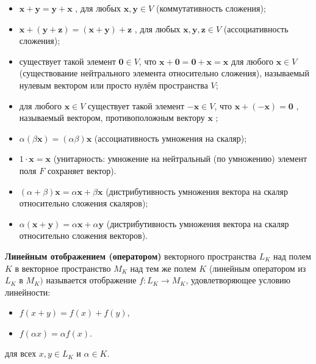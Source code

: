 \documentclass[12pt]{matmex-diploma}
\begin{document}
            \begin{itemize}
                \item $\mathbf {x} +\mathbf {y} =\mathbf {y} +\mathbf {x}$ , для любых $\mathbf {x} ,\mathbf {y} \in V$ (коммутативность сложения);
                \item $\mathbf {x} +(\mathbf {y} +\mathbf {z} )=(\mathbf {x} +\mathbf {y} )+\mathbf {z}$ , для любых $\mathbf {x} ,\mathbf {y} ,\mathbf {z} \in V$ (ассоциативность сложения);
                \item существует такой элемент $\mathbf {0} \in V$, что $\mathbf {x} +\mathbf {0} =\mathbf {0} +\mathbf {x} =\mathbf {x}$ для любого $\mathbf {x} \in V$ (существование нейтрального элемента относительно сложения), называемый нулевым вектором или просто нулём пространства $V$;
                \item для любого $\mathbf {x} \in V$ существует такой элемент $-\mathbf {x} \in V$, что $\mathbf {x} +(-\mathbf {x} )=\mathbf {0}$ , называемый вектором, противоположным вектору $\mathbf {x}$ ;
                \item $\alpha (\beta \mathbf {x} )=(\alpha \beta )\mathbf {x}$  (ассоциативность умножения на скаляр);
                \item $1\cdot \mathbf {x} =\mathbf {x}$  (унитарность: умножение на нейтральный (по умножению) элемент поля $F$ сохраняет вектор).
                \item $(\alpha +\beta )\mathbf {x} =\alpha \mathbf {x} +\beta \mathbf {x}$  (дистрибутивность умножения вектора на скаляр относительно сложения скаляров);
                \item $\alpha (\mathbf {x} +\mathbf {y} )=\alpha \mathbf {x} +\alpha \mathbf {y}$ (дистрибутивность умножения вектора на скаляр относительно сложения векторов).
            \end{itemize}    
            
            \textbf{Линейным отображением (оператором)} векторного пространства $L_{K}$ над полем $K$ в векторное пространство $M_{K}$ над тем же полем $K$ (линейным оператором из $L_{K}$ в $M_{K})$ называется отображение $f\colon L_{K}\to M_{K}$, удовлетворяющее условию линейности:
            \begin{itemize}
                \item $f(x+y)=f(x)+f(y)$,
                \item $f(\alpha x)=\alpha f(x)$.
            \end{itemize}              
            для всех $x,y\in L_{K}$ и $\alpha \in K$.
            
\end{document}
